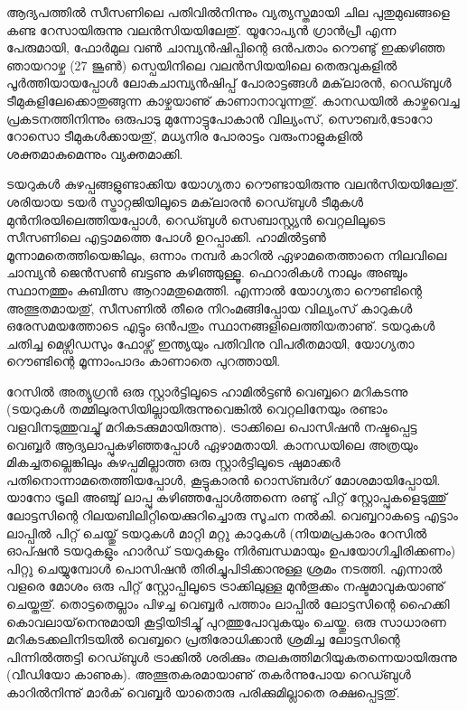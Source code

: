 ﻿
\vskip 2pt

ആദ്യപത്തില്‍ സീസണിലെ പതിവില്‍നിന്നും വ്യത്യസ്തമായി ചില പുതുമുഖങ്ങളെ കണ്ട റേസായിരുന്നു വലന്‍സിയയിലേതു്. 
യൂറോപ്യന്‍ ഗ്രാന്‍പ്രീ എന്ന പേരുമായി, ഫോര്‍മുല വണ്‍ ചാമ്പ്യന്‍ഷിപ്പിന്റെ ഒന്‍പതാം റൌണ്ടു് ഇക്കഴിഞ്ഞ ഞായറാഴ്ച (27
ജൂണ്‍) സ്പെയിനിലെ വലന്‍സിയയിലെ തെരുവുകളില്‍ പൂര്‍ത്തിയായപ്പോള്‍ ലോകചാമ്പ്യന്‍ഷിപ്പ് പോരാട്ടങ്ങള്‍ മക്‌ലാരന്‍,
റെഡ്ബുള്‍ ടീമുകളിലേക്കൊതുങ്ങുന്ന കാഴ്ചയാണു് കാണാനാവുന്നതു്. കാനഡയില്‍ കാഴ്ചവെച്ച പ്രകടനത്തിനിന്നും 
ഒരുപാടു മുന്നോട്ടുപോകാന്‍ വില്യംസ്, സൌബര്‍,ടോറോ റോസൊ ടീമുകള്‍ക്കായതു്, മധ്യനിര പോരാട്ടം വരുംനാളുകളില്‍
ശക്തമാകുമെന്നും വ്യക്തമാക്കി.

ടയറുകള്‍ കുഴപ്പങ്ങളുണ്ടാക്കിയ യോഗ്യതാ റൌണ്ടായിരുന്നു വലന്‍സിയയിലേതു്. ശരിയായ ടയര്‍ സ്ട്രാറ്റജിയിലൂടെ മക്‌ലാരന്‍
റെഡ്ബുള്‍ ടീമുകള്‍ മുന്‍നിരയിലെത്തിയപ്പോള്‍, റെഡ്ബുള്‍ സെബാസ്റ്റ്യന്‍ വെറ്റലിലൂടെ സീസണിലെ എട്ടാമത്തെ പോള്‍ 
ഉറപ്പാക്കി. ഹാമില്‍ട്ടണ്‍ മൂന്നാമതെത്തിയെങ്കിലും, ഒന്നാം നമ്പര്‍ കാറില്‍ ഏഴാമതെത്താനെ നിലവിലെ ചാമ്പ്യന്‍ ജെന്‍സണ്‍
ബട്ടണു കഴിഞ്ഞുള്ളൂ. ഫെറാരികള്‍ നാലും അഞ്ചും സ്ഥാനത്തും കുബിത്സ ആറാമതുമെത്തി. എന്നാല്‍ യോഗ്യതാ റൌണ്ടിന്റെ
അത്ഭുതമായതു്, സീസണില്‍ തീരെ നിറംമങ്ങിപ്പോയ വില്യംസ് കാറുകള്‍ ഒരേസമയത്തോടെ എട്ടും ഒന്‍പതും 
സ്ഥാനങ്ങളിലെത്തിയതാണു്. ടയറുകള്‍ ചതിച്ച മെഴ്സിഡസും ഫോഴ്സ് ഇന്ത്യയും പതിവിനു വിപരീതമായി, യോഗ്യതാ റൌണ്ടിന്റെ
മൂന്നാംപാദം കാണാതെ പുറത്തായി.

റേസില്‍ അത്യുഗ്രന്‍ ഒരു സ്റ്റാര്‍ട്ടിലൂടെ ഹാമില്‍ട്ടണ്‍ വെബ്ബറെ മറികടന്നു (ടയറുകള്‍ തമ്മിലുരസിയില്ലായിരുന്നുവെങ്കില്‍ 
വെറ്റലിനേയും രണ്ടാം വളവിനടുത്തുവച്ചു് മറികടക്കുമായിരുന്നു). ട്രാക്കിലെ പൊസിഷന്‍ നഷ്ടപ്പെട്ട വെബ്ബര്‍ 
ആദ്യലാപ്പുകഴിഞ്ഞപ്പോള്‍ ഏഴാമതായി. കാനഡയിലെ അത്രയും മികച്ചതല്ലെങ്കിലും കുഴപ്പമില്ലാത്ത ഒരു സ്റ്റാര്‍ട്ടിലൂടെ 
ഷുമാക്കര്‍ പതിനൊന്നാമതെത്തിയപ്പോള്‍, കൂട്ടുകാരന്‍ റൊസ്ബര്‍ഗ് മോശമായിപ്പോയി. യാനോ ട്രൂലി അഞ്ചു് ലാപ്പു 
കഴിഞ്ഞപ്പോള്‍ത്തന്നെ രണ്ടു് പിറ്റ് സ്റ്റോപ്പുകളെടുത്തു് ലോട്ടസിന്റെ റിലയബിലിറ്റിയെക്കുറിച്ചൊരു സൂചന നല്‍കി. 
വെബ്ബറാകട്ടെ എട്ടാം ലാപ്പില്‍ പിറ്റ് ചെയ്തു് ടയറുകള്‍ മാറ്റി മറ്റു കാറുകള്‍ (നിയമപ്രകാരം റേസില്‍ ഓപ്ഷന്‍ ടയറുകളും 
ഹാര്‍ഡ് ടയറുകളും നിര്‍ബന്ധമായും ഉപയോഗിച്ചിരിക്കണം) പിറ്റു ചെയ്യുമ്പോള്‍ പൊസിഷന്‍ തിരിച്ചുപിടിക്കാനുള്ള ശ്രമം 
നടത്തി. എന്നാല്‍ വളരെ മോശം ഒരു പിറ്റ് സ്റ്റോപ്പിലൂടെ ട്രാക്കിലുള്ള മുന്‍തൂക്കം നഷ്ടമാവുകയാണു് ചെയ്തതു്. 
തൊട്ടതെല്ലാം പിഴച്ച വെബ്ബര്‍ പത്താം ലാപ്പില്‍ ലോട്ടസിന്റെ ഹൈക്കി കൊവലായ്‌നെനുമായി കൂട്ടിയിടിച്ചു് പുറത്തുപോവുകയും ചെയ്തു. 
ഒരു സാധാരണ മറികടക്കലിനിടയില്‍ വെബ്ബറെ പ്രതിരോധിക്കാന്‍ ശ്രമിച്ച ലോട്ടസിന്റെ പിന്നില്‍ത്തട്ടി 
റെഡ്ബുള്‍ ട്രാക്കില്‍ ശരിക്കും തലകുത്തിമറിയുകതന്നെയായിരുന്നു (വീഡിയോ കാണുക). അത്ഭുതകരമായാണു് 
തകര്‍ന്നുപോയ റെഡ്ബുള്‍ കാറില്‍നിന്നു് മാര്‍ക് വെബ്ബര്‍ യാതൊരു പരിക്കുമില്ലാതെ രക്ഷപ്പെട്ടതു്.

